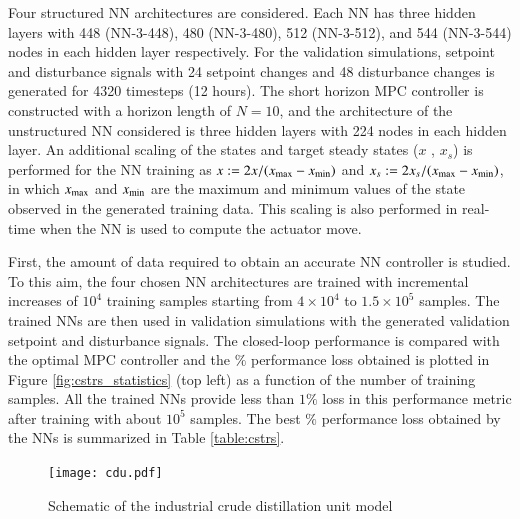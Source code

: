 \documentclass[preprint,5p, twocolumn, authoryear]{elsarticle}
\begin{document}
Four structured NN architectures 
are considered. Each NN
has three hidden layers with 
448 (NN-3-448), 480 (NN-3-480), 
512 (NN-3-512), and 544 (NN-3-544) 
nodes in each hidden 
layer respectively. For the validation simulations, 
setpoint and disturbance signals 
with 24 setpoint changes and 48 disturbance changes 
is generated for 4320 timesteps (12 hours). 
The short horizon MPC controller is constructed with a 
horizon length of $N = 10$, and the architecture 
of the unstructured NN considered 
is three hidden layers with 224 nodes in each hidden layer. 
An additional scaling of the 
states and target steady states ($x$ , $x_s$) is performed for the 
NN training as $x := 2x/(x_{\textnormal{max}} - x_{\textnormal{min}})$ and 
$x_s := 2x_s/(x_{\textnormal{max}} - x_{\textnormal{min}})$,
in which $x_{\textnormal{max}}$ and $x_{\textnormal{min}}$
are the maximum and minimum values of the state 
observed in the generated training data.
This scaling is also performed in real-time 
when the NN is used to compute the actuator move.

First, the amount of data required to obtain an accurate 
NN controller is studied. To this aim, the four chosen NN 
architectures are trained with incremental increases of 
$10^4$ training samples starting from $4 \times 10^4$
to $1.5 \times 10^5$ samples. The trained NNs 
are then used in validation simulations
with the generated validation setpoint and disturbance
signals. The closed-loop performance is compared with the optimal MPC 
controller and the $\%$ performance loss obtained
is plotted in Figure \ref{fig:cstrs_statistics} (top left)
as a function of the number of training samples.
All the trained NNs provide less than $1 \%$ loss in 
this performance metric after training with 
about $10^5$ samples. The best $\%$ performance
loss obtained by the NNs is summarized in
Table \ref{table:cstrs}.

\begin{figure}[!h]
    \centering
    \texttt{[image: cdu.pdf]}
    \caption{Schematic of the industrial crude distillation unit model}
    \label{fig:schematic_cdu}
\end{figure}
\end{document}
